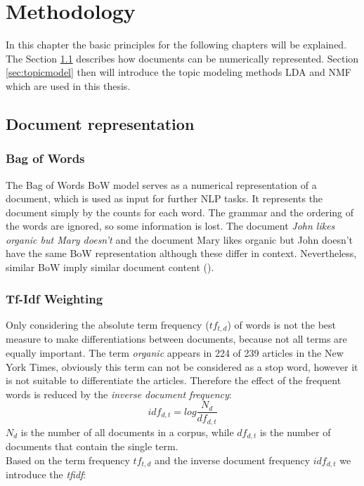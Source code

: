 \chapter{Methodology}
\label{methodology}
In this chapter the basic principles for the following chapters will be explained.
The Section \ref{sec:docrep} describes how documents can be numerically represented. Section \ref{sec:topicmodel} then will introduce the topic modeling methods \ac{LDA} and \ac{NMF} which are used in this thesis.

\section{Document representation}
\label{sec:docrep}

\subsection{Bag of Words}
The Bag of Words \ac{BoW} model serves as a numerical representation of a document, which is used as input for further \ac{NLP} tasks.
It represents the document simply by the counts for each word. The grammar and the ordering of the words are ignored, so some information is lost. The document \textit{John likes organic but Mary doesn't} and the document {Mary likes organic but John doesn't} have the same \ac{BoW} representation although these differ in context. Nevertheless, similar \ac{BoW} imply similar document content (\cite{Manning2008}). 

\subsection{Tf-Idf Weighting}
Only considering the absolute term frequency ($tf_{t,d}$) of words is not the best measure to make differentiations between documents, because not all terms are equally important. 
The term \textit{organic} appears in  224 of 239 articles in the New York Times, obviously this term can not be considered as a stop word, however it is not suitable to differentiate the articles. Therefore the effect of the frequent words is reduced by the \textit{inverse document frequency}:
\begin{equation}
idf_{d,t} = log\dfrac{N_{d}}{df_{d,t}}
\end{equation}
$N_{d}$ is the number of all documents in a corpus, while $df_{d,t}$ is the number of documents that contain the single term.\\
Based on the term frequency $tf_{t,d}$ and the inverse document frequency $idf_{d,t}$ we introduce the \textit{\ac{tfidf}}: 

